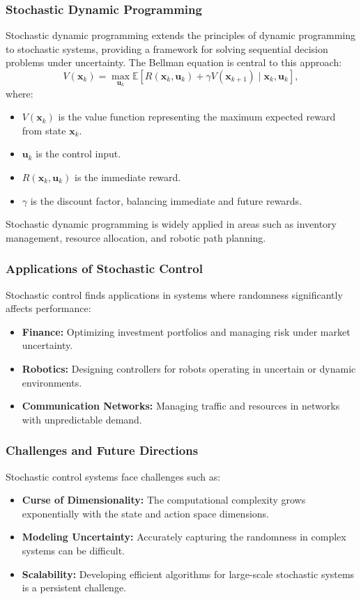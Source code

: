 \documentclass{IEEEojcsys}
\begin{document}
\subsubsection{Stochastic Dynamic Programming}
Stochastic dynamic programming extends the principles of dynamic programming to stochastic systems, providing a framework for solving sequential decision problems under uncertainty. The Bellman equation is central to this approach:
\[
V(\mathbf{x}_k) = \max_{\mathbf{u}_k} \mathbb{E}\left[R(\mathbf{x}_k, \mathbf{u}_k) + \gamma V(\mathbf{x}_{k+1}) \mid \mathbf{x}_k, \mathbf{u}_k \right],
\]
where:
\begin{itemize}
    \item $V(\mathbf{x}_k)$ is the value function representing the maximum expected reward from state $\mathbf{x}_k$.
    \item $\mathbf{u}_k$ is the control input.
    \item $R(\mathbf{x}_k, \mathbf{u}_k)$ is the immediate reward.
    \item $\gamma$ is the discount factor, balancing immediate and future rewards.
\end{itemize}
Stochastic dynamic programming is widely applied in areas such as inventory management, resource allocation, and robotic path planning.

\subsubsection{Applications of Stochastic Control}
Stochastic control finds applications in systems where randomness significantly affects performance:
\begin{itemize}
    \item \textbf{Finance:} Optimizing investment portfolios and managing risk under market uncertainty.
    \item \textbf{Robotics:} Designing controllers for robots operating in uncertain or dynamic environments.
    \item \textbf{Communication Networks:} Managing traffic and resources in networks with unpredictable demand.
\end{itemize}

\subsubsection{Challenges and Future Directions}
Stochastic control systems face challenges such as:
\begin{itemize}
    \item \textbf{Curse of Dimensionality:} The computational complexity grows exponentially with the state and action space dimensions.
    \item \textbf{Modeling Uncertainty:} Accurately capturing the randomness in complex systems can be difficult.
    \item \textbf{Scalability:} Developing efficient algorithms for large-scale stochastic systems is a persistent challenge.
\end{itemize}
\end{document}
